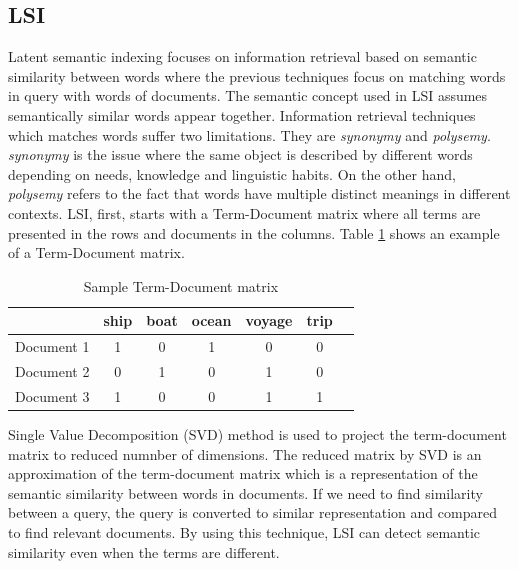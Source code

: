 \subsection{LSI}
\label{background:lsi}
Latent semantic indexing focuses on information retrieval based on semantic similarity between words where the previous techniques focus on matching words in query with words of documents. The semantic concept used in LSI assumes semantically similar words appear together. Information retrieval techniques which matches words suffer two limitations. They are \emph{synonymy} and \emph{polysemy}. \emph{synonymy} is the issue where the same object is described by different words depending on needs, knowledge and linguistic habits. On the other hand, \emph{polysemy} refers to the fact that words have multiple distinct meanings in different contexts. LSI, first, starts with a  Term-Document matrix where all terms are presented in the rows and documents in the columns. Table \ref{tb:LSI_term_document} shows an example of a Term-Document matrix. 

\begin{table}[h]
    \centering
    \caption{Sample Term-Document matrix}
 \begin{tabular}{|c|c|c|c|c|c|c|}
    \hline
    
        & ship & boat & ocean & voyage & trip   \\
        \hline
        Document 1 & 1 & 0 & 1 & 0 & 0  \\
        Document 2 & 0 & 1 & 0 & 1 & 0    \\
        Document 3 & 1 & 0 & 0 & 1 & 1  \\
    \hline
    \end{tabular}
    
    \label{tb:LSI_term_document}
\end{table}


Single Value Decomposition (SVD) method is used to project the term-document matrix to reduced numnber of dimensions.
The reduced matrix by SVD is an approximation of the term-document matrix which is a representation of the semantic similarity between words in documents. If we need to find similarity between a query, the query is converted to similar representation and compared to find relevant documents. By using this technique, LSI can detect semantic similarity even when the terms are different.   


